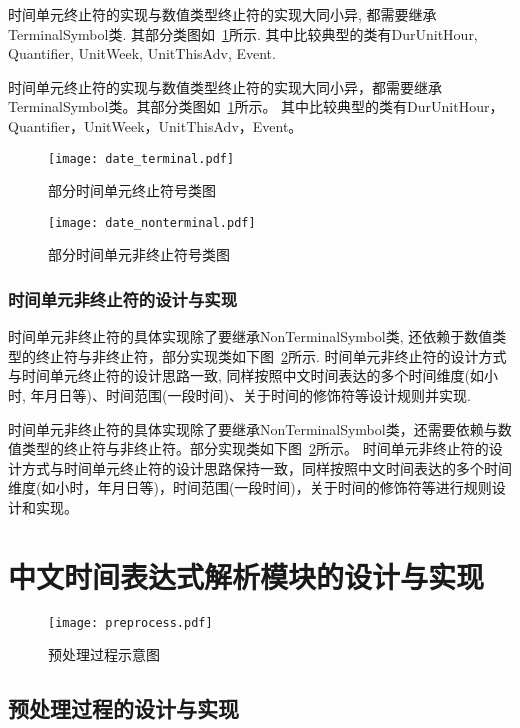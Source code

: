 时间单元终止符的实现与数值类型终止符的实现大同小异, 都需要继承TerminalSymbol类.  其部分类图如~\ref{fig:date_terminal}所示.
其中比较典型的类有DurUnitHour, Quantifier, UnitWeek, UnitThisAdv, Event.

时间单元终止符的实现与数值类型终止符的实现大同小异，都需要继承TerminalSymbol类。其部分类图如~\ref{fig:date_terminal}所示。
其中比较典型的类有DurUnitHour，Quantifier，UnitWeek，UnitThisAdv，Event。

\begin{figure}[h]
    \centering
    \texttt{[image: date\_terminal.pdf]}
    \caption{部分时间单元终止符号类图}
    \label{fig:date_terminal}
\end{figure}

\begin{figure}[h]
    \centering
    \texttt{[image: date\_nonterminal.pdf]}
    \caption{部分时间单元非终止符号类图}
    \label{fig:date_nonterminal}
\end{figure}

\subsubsection{时间单元非终止符的设计与实现}

时间单元非终止符的具体实现除了要继承NonTerminalSymbol类, 还依赖于数值类型的终止符与非终止符，部分实现类如下图~\ref{fig:date_nonterminal}所示.
时间单元非终止符的设计方式与时间单元终止符的设计思路一致, 同样按照中文时间表达的多个时间维度(如小时, 年月日等)、时间范围(一段时间)、关于时间的修饰符等设计规则并实现.

时间单元非终止符的具体实现除了要继承NonTerminalSymbol类，还需要依赖与数值类型的终止符与非终止符。部分实现类如下图~\ref{fig:date_nonterminal}所示。
时间单元非终止符的设计方式与时间单元终止符的设计思路保持一致，同样按照中文时间表达的多个时间维度(如小时，年月日等)，时间范围(一段时间)，关于时间的修饰符等进行规则设计和实现。

\section{中文时间表达式解析模块的设计与实现}

\begin{figure}[h]
    \centering
    \texttt{[image: preprocess.pdf]}
    \caption{预处理过程示意图}
    \label{fig:preprocess}
\end{figure}

\subsection{预处理过程的设计与实现}

